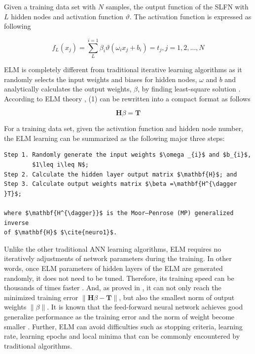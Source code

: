 \documentclass[runningheads,a4paper]{llncs}
\begin{document}
Given a training data set with $N$ samples, the output function of the SLFN with $L$ hidden nodes and activation function $\vartheta$. The activation function is expressed as following

\begin{equation}
f_{L}(x_{j})=\sum_{L}^{i=1}\beta _{i}\vartheta (\omega _{i}x_{j}+b_{i}) = t_{j}, j=1, 2, ..., N
\end{equation}


ELM is completely different from traditional iterative learning algorithms as it randomly selects the input weights and biases for hidden nodes,  $\omega$ and $b$ and analytically calculates the output weights, $\beta$, by finding least-square solution \cite{neuro1}. According to ELM theory \cite{neuro1}, (1) can be rewritten into a compact format as follows

\begin{equation}
\textbf{H}\beta =\mathbf{T}
\end{equation}

For a training data set, given the activation function and hidden node number, the ELM learning can be summarized as the following major three steps:

\begin{lstlisting}
Step 1. Randomly generate the input weights $\omega _{i}$ and $b_{i}$,
        $1\leq i\leq N$;
Step 2. Calculate the hidden layer output matrix $\mathbf{H}$; and 
Step 3. Calculate output weights matrix $\beta =\mathbf{H^{\dagger }T}$;
   
where $\mathbf{H^{\dagger}}$ is the Moor–Penrose (MP) generalized inverse 
of $\mathbf{H}$ $\cite{neuro1}$.
\end{lstlisting}

Unlike the other traditional ANN learning algorithms, ELM requires no iteratively adjustments of network parameters during the training. In other words, once ELM parameters of hidden layers of the ELM are generated randomly, it does not need to be tuned. Therefore, its training speed can be thousands of times faster \cite{elm_better_than_ann}. And, as proved in \cite{neuro1}, it can not only reach the minimized training error $\left \| \mathbf{H}\beta -\mathbf{T} \right \|$, but also the smallest norm of output weights $\left \| \beta \right \|$. It is known that the feed-forward neural network achieves good generalize performance as the training error and the norm of weight become smaller \cite{neuro2}. Further, ELM can avoid difficulties such as stopping criteria, learning rate, learning epochs and local minima that can be commonly encountered by traditional algorithms.
\end{document}
